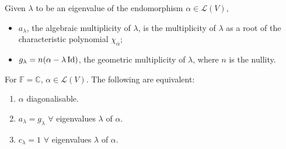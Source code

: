 \documentclass[a4paper]{article}
\begin{document}
\begin{defi}[Multiplicity]
Given $\lambda$ to be an eigenvalue of the endomorphism $\alpha\in\mathcal{L}(V)$,
\begin{itemize}
    \item $a_\lambda$, the algebraic multiplicity of $\lambda$, is the multiplicity of $\lambda$ as a root of the characteristic polynomial $\chi_\alpha$;
    \item $g_\lambda=n(\alpha-\lambda\operatorname{Id})$, the geometric multiplicity of $\lambda$, where $n$ is the nullity.
\end{itemize}
\end{defi}
\begin{prop}
For $\mathbb{F}=\mathbb{C}$, $\alpha\in\mathcal{L}(V)$. The following are equivalent:
\begin{enumerate}
    \item $\alpha$ diagonalisable.
    \item $a_\lambda=g_\lambda$ $\forall$ eigenvalues $\lambda$ of $\alpha$.
    \item $c_\lambda=1$ $\forall$ eigenvalues $\lambda$ of $\alpha$.
\end{enumerate}
\end{prop}

\newpage
\end{document}
